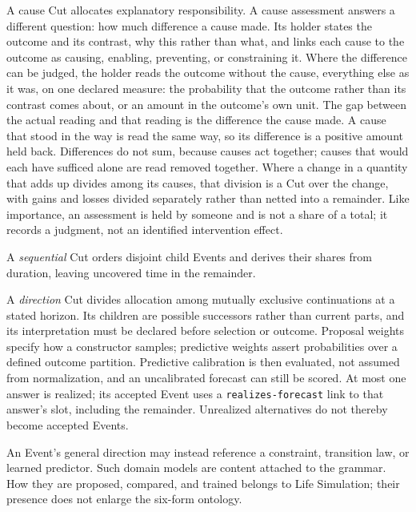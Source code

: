 \documentclass[11pt,a4paper]{article}
\begin{document}
A cause Cut allocates explanatory responsibility. A cause assessment answers a
different question: how much difference a cause made. Its holder states the
outcome and its contrast, why this rather than what, and links each cause to
the outcome as causing, enabling, preventing, or constraining it. Where the
difference can be judged, the holder reads the outcome without the cause,
everything else as it was, on one declared measure: the probability that the
outcome rather than its contrast comes about, or an amount in the outcome's own
unit. The gap between the actual reading and that reading is the difference the
cause made. A cause that stood in the way is read the same way, so its difference
is a positive amount held back. Differences do not sum, because causes act
together; causes that would each have sufficed alone are read removed together.
Where a change in a quantity that adds up divides among its causes, that division
is a Cut over the change, with gains and losses divided separately rather than
netted into a remainder. Like importance, an assessment is held by someone and is
not a share of a total; it records a judgment, not an identified intervention
effect.

A \emph{sequential} Cut orders disjoint child Events and derives their shares
from duration, leaving uncovered time in the remainder.

A \emph{direction} Cut divides allocation among mutually exclusive continuations at a stated
horizon. Its children are possible successors rather than current parts, and
its interpretation must be declared before selection or outcome. Proposal
weights specify how a constructor samples; predictive weights assert
probabilities over a defined outcome partition. Predictive calibration is then
evaluated, not assumed from normalization, and an uncalibrated forecast can
still be scored. At most one answer is realized; its accepted Event uses a
\texttt{realizes-forecast} link to that answer's slot, including the remainder.
Unrealized alternatives do not thereby become accepted Events.

An Event's general direction may instead reference a constraint, transition
law, or learned predictor. Such domain models are content attached to the
grammar. How they are proposed, compared, and trained belongs to Life
Simulation; their presence does not enlarge the six-form ontology.
\end{document}

